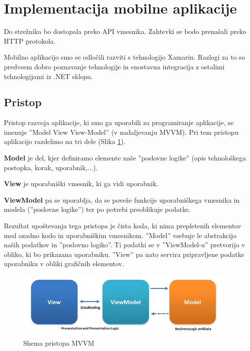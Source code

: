 \documentclass[a4paper, 12pt]{book}
\begin{document}
\section{Implementacija mobilne aplikacije}



Do strežnika bo dostopala preko API vmesnika.
Zahtevki se bodo prenašali preko HTTP protokola.

Mobilno aplikacijo smo se odločili razviti s tehnologijo Xamarin.
Razlogi za to so predvsem dobro poznavanje tehnologije in enostavna integracija z ostalimi tehnologijami iz .NET sklopa.


\subsection{Pristop}
Pristop razvoja aplikacije, ki smo ga uporabili za programiranje aplikacije, se imenuje ''Model View View-Model'' (v nadaljevanju MVVM).
Pri tem pristopu aplikacijo razdelimo na tri dele (Slika \ref{mvvm}).

\textbf{Model} je del, kjer definiramo elemente naše ''poslovne logike'' (opis tehnološkega postopka, korak, uporabnik,...).

\textbf{View} je uporabniški vmesnik, ki ga vidi uporabnik.

\textbf{ViewModel} pa se uporablja, da se poveže funkcije uporabniškega vmesnika in modela (''poslovne logike'') ter po potrebi preoblikuje podatke.

Rezultat upoštevanja tega pristopa je čista koda, ki nima prepletenih elementov med ozadno kodo in uporabniškim vmesnikom.
''Model'' vsebuje le abstrakcijo naših podatkov in ''poslovno logiko''.
Ti podatki se v ''ViewModel-u'' pretvorijo v obliko, ki bo prikazana uporabniku.
''View'' pa nato servira pripravljene podatke uporabniku v obliki grafičnih elementov.

\begin{figure}[H]
\begin{center}
\includegraphics[width=11cm]{mvvm}
\end{center}
	\caption{Shema pristopa MVVM}
\label{mvvm}
\end{figure}
\end{document}
